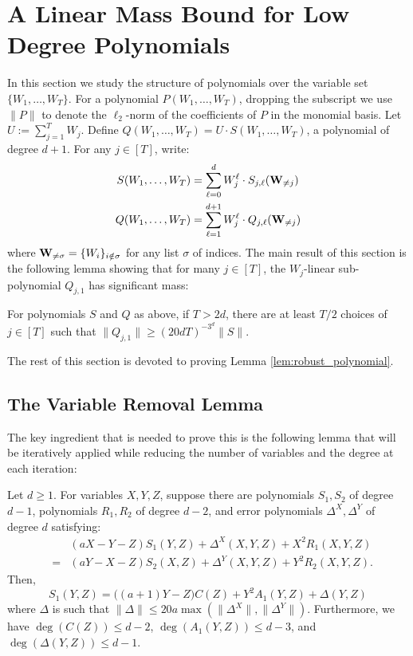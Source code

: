 \section{A Linear Mass Bound for Low Degree Polynomials}\label{sec:struct}



In this section we study the structure of polynomials over the variable set $\{W_1,\dots, W_T\}$. For a polynomial $P(W_1,\dots,W_T)$, dropping the subscript we use $\|P\|$ to denote the $\ell_2$-norm of the coefficients of $P$ in the monomial basis.  
Let $U := \sum_{j=1}^T W_j.$ Define $Q(W_1, \dots, W_T) = U \cdot S(W_1, \dots, W_T)$, a polynomial of degree $d+1$. For any $j \in [T]$, write:
		\begin{align}
			S(W_1,\ldots,W_T) &= \sum_{\ell = 0}^{d}W^\ell_j \cdot S_{j,\ell}({\bf W}_{\ne j}) \label{eq:expand_S}\\
			Q(W_1,\ldots,W_T) &= \sum_{\ell = 1}^{d+1}W^\ell_j \cdot Q_{j,\ell}({\bf W}_{\ne j}) 		\label{eq:expand_Q}
		\end{align}
		where $\mathbf{W}_{\neq \sigma}= \{W_i\}_{i \notin \sigma}$ for any list $\sigma$ of indices.
The main result of this section is the following lemma showing that for many $j \in [T]$, the $W_j$-linear sub-polynomial $Q_{j,1}$ has significant mass:
\begin{lemma}					\label{lem:robust_polynomial}
	For polynomials $S$ and $Q$ as above, if $T > 2d$, there are at least $T/2$ choices of $j \in [T]$ such that $\|Q_{j,1}\|\geq (20dT)^{-3^d}\|S\|$. 
\end{lemma}
The rest of this section is devoted to proving Lemma \ref{lem:robust_polynomial}.

\subsection{The Variable Removal Lemma}

The key ingredient that is needed to prove this is the following lemma that will be iteratively applied while reducing the number of variables and the degree at each iteration:
\begin{lemma}					\label{lem:varred}
Let $d\geq 1$. For variables $X, Y, Z$, suppose there are polynomials $S_1, S_2$ of degree $d-1$, polynomials $R_1, R_2$ of degree $d-2$, and error polynomials $\Delta^X,\Delta^Y$ of degree $d$ satisfying:
    \begin{eqnarray}	
	& & (aX- Y- Z)S_1(Y,Z) + \Delta^X(X,Y,Z) + X^2R_1(X,Y,Z) \nonumber \\ 
	& = & (aY- X- Z)S_2(X,Z) + \Delta^Y(X,Y,Z) + Y^2R_2(X,Y,Z). \label{eqn:rp}
	\end{eqnarray}
Then,
$$S_1(Y,Z) = \Big((a+1)Y - Z \Big)C(Z) +Y^2A_{1}(Y,Z)+\Delta(Y,Z)$$ 
where $\Delta$ is such that $\|\Delta\| \le 20a\max(\|\Delta^X\|,\|\Delta^Y\|)$. Furthermore, we have $\deg(C(Z)) \le d-2$, $\deg(A_1(Y,Z)) \leq d-3$, and $\deg(\Delta(Y,Z))\leq d-1$. 
\end{lemma}

